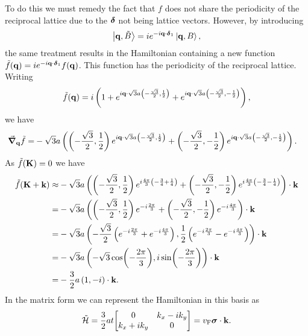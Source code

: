 To do this we must remedy the fact that $f$ does not share the periodicity of the reciprocal lattice due to the $\vb*{\delta}$ not being lattice vectors. However, by introducing
\begin{align*}
	\ket{\vb{q}, \tilde{B}} = ie^{-i\vb{q}\cdot\vb*{\delta}_{1}}\ket{\vb{q}, B},
\end{align*}
the same treatment results in the Hamiltonian containing a new function $\tilde{f}(\vb{q}) = ie^{-i\vb{q}\cdot\vb*{\delta}_{1}}f(\vb{q})$. This function has the periodicity of the reciprocal lattice. Writing
\begin{align*}
	\tilde{f}(\vb{q}) = i\left(1 + e^{i\vb{q}\cdot\sqrt{3}a\left(-\frac{\sqrt{3}}{2}, \frac{1}{2}\right)} + e^{i\vb{q}\cdot\sqrt{3}a\left(-\frac{\sqrt{3}}{2}, -\frac{1}{2}\right)}\right),
\end{align*}
we have
\begin{align*}
	\grad_{\vb{q}}\tilde{f} =& -\sqrt{3}a\left(\left(-\frac{\sqrt{3}}{2}, \frac{1}{2}\right)e^{i\vb{q}\cdot\sqrt{3}a\left(-\frac{\sqrt{3}}{2}, \frac{1}{2}\right)} + \left(-\frac{\sqrt{3}}{2}, -\frac{1}{2}\right)e^{i\vb{q}\cdot\sqrt{3}a\left(-\frac{\sqrt{3}}{2}, -\frac{1}{2}\right)}\right).
\end{align*}
As $\tilde{f}(\vb{K}) = 0$ we have
\begin{align*}
	\tilde{f}(\vb{K} + \vb{k}) \approx& -\sqrt{3}a\left(\left(-\frac{\sqrt{3}}{2}, \frac{1}{2}\right)e^{i\frac{4\pi}{3}\left(-\frac{3}{4} + \frac{1}{4}\right)} + \left(-\frac{\sqrt{3}}{2}, -\frac{1}{2}\right)e^{i\frac{4\pi}{3}\left(-\frac{3}{4} - \frac{1}{4}\right)}\right)\cdot\vb{k} \\
	=& -\sqrt{3}a\left(\left(-\frac{\sqrt{3}}{2}, \frac{1}{2}\right)e^{-i\frac{2\pi}{3}} + \left(-\frac{\sqrt{3}}{2}, -\frac{1}{2}\right)e^{-i\frac{4\pi}{3}}\right)\cdot\vb{k} \\
	=& -\sqrt{3}a\left(-\frac{\sqrt{3}}{2}\left(e^{-i\frac{2\pi}{3}} + e^{-i\frac{4\pi}{3}}\right), \frac{1}{2}\left(e^{-i\frac{2\pi}{3}} - e^{-i\frac{4\pi}{3}}\right)\right)\cdot\vb{k} \\
	=& -\sqrt{3}a\left(-\sqrt{3}\cos(-\frac{2\pi}{3}), i\sin(-\frac{2\pi}{3})\right)\cdot\vb{k} \\
	=& -\frac{3}{2}a\left(1, -i\right)\cdot\vb{k}.
\end{align*}
In the matrix form we can represent the Hamiltonian in this basis as
\begin{align*}
	\tilde{\ham} = \frac{3}{2}at\mqty[
		0               & k_{x} - ik_{y} \\
		k_{x} + ik_{y}  & 0 \\
	] = v_{\text{F}}\vb*{\sigma}\cdot\vb{k}.
\end{align*}
